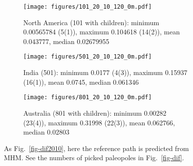 \begin{figure*}
	\centering
	\begin{subfigure}{1.01\textwidth}
		\texttt{[image: figures/101\_20\_10\_120\_0m.pdf]}
		\caption{North America (101 with children): minimum 0.00565784 (5(1)),
		maximum 0.104618 (14(2)), mean 0.043777, median 0.02679955}\label{fig-na-dif2010m}
	\end{subfigure}
	\vspace{.1em}
	\begin{subfigure}{1.01\textwidth}
		\texttt{[image: figures/501\_20\_10\_120\_0m.pdf]}
		\caption{India (501): minimum 0.0177 (4(3)), maximum 0.15937 (16(1)), mean
		0.0745, median 0.061346}\label{fig-in-dif2010m}
	\end{subfigure}
	\vspace{.1em}
	\begin{subfigure}{1.01\textwidth}
		\texttt{[image: figures/801\_20\_10\_120\_0m.pdf]}
		\caption{Australia (801 with children): minimum 0.00282 (23(4)), maximum
		0.31998 (22(3)), mean 0.062766, median 0.02803}\label{fig-au-dif2010m}
	\end{subfigure}
	\caption[Differences of each plate's paleomagnetic APWPs versus
its MHM predicted APWP]{As Fig.~\ref{fig-dif2010}, here the reference path is
predicted from MHM\@. See the numbers of picked paleopoles in
Fig.~\ref{fig-dif}.}\label{fig-dif2010m}
\end{figure*}

